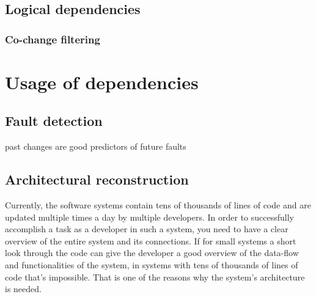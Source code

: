 \documentclass[12pt]{mitthesis}
\begin{document}
\section{Logical dependencies}
\subsection{Co-change filtering}


\chapter{Usage of dependencies}

\section{Fault detection}
past changes are good predictors of future faults

\section{Architectural reconstruction}
Currently, the software systems contain tens of thousands of lines of code and are updated multiple times a day by multiple developers.  In order to successfully accomplish a task as a developer in such a system, you need to have a clear overview of the entire system and its connections. If for small systems a short look through the code can give the developer a good overview of the data-flow and functionalities of the system, in systems with tens of thousands of lines of code that's impossible. That is one of the reasons why the system's architecture is needed.
\end{document}
